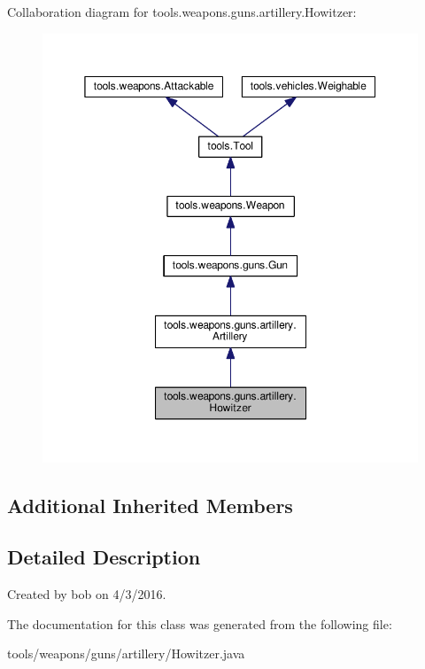 Collaboration diagram for tools.\+weapons.\+guns.\+artillery.\+Howitzer\+:
\nopagebreak
\begin{figure}[H]
\begin{center}
\leavevmode
\includegraphics[width=350pt]{classtools_1_1weapons_1_1guns_1_1artillery_1_1_howitzer__coll__graph}
\end{center}
\end{figure}
\subsection*{Additional Inherited Members}


\subsection{Detailed Description}
Created by bob on 4/3/2016. 

The documentation for this class was generated from the following file\+:\begin{DoxyCompactItemize}
\item 
tools/weapons/guns/artillery/Howitzer.\+java\end{DoxyCompactItemize}
